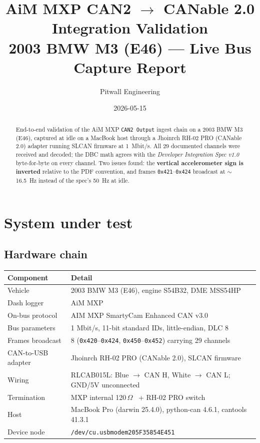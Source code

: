 \documentclass[11pt,a4paper]{article}
\title{\textbf{AiM MXP CAN2 $\rightarrow$ CANable 2.0 Integration Validation}\\
       \large 2003 BMW M3 (E46) --- Live Bus Capture Report}
\author{Pitwall Engineering}
\date{2026-05-15}
\newcommand{\ok}{\textcolor{ok}{\checkmark}}
\newcommand{\hex}[1]{\texttt{0x#1}}
\begin{document}
\maketitle

\begin{abstract}
\noindent
End-to-end validation of the AiM MXP \texttt{CAN2 Output} ingest chain
on a 2003 BMW M3 (E46), captured at idle on a MacBook host through a
Jhoinrch RH-02 PRO (CANable 2.0) adapter running SLCAN firmware at
\SI{1}{Mbit/s}. All 29 documented channels were received and
decoded; the DBC math agrees with the \emph{Developer Integration
Spec v1.0} byte-for-byte on every channel. Two issues found: the
\textbf{vertical accelerometer sign is inverted} relative to the PDF
convention, and frames \hex{421}--\hex{424} broadcast at $\sim$\SI{16.5}{Hz}
instead of the spec's \SI{50}{Hz} at idle.
\end{abstract}

\section{System under test}

\subsection{Hardware chain}

\begin{tabular}{@{}ll@{}}
\toprule
Component & Detail \\
\midrule
Vehicle              & 2003 BMW M3 (E46), engine S54B32, DME MSS54HP \\
Dash logger          & AiM MXP \\
On-bus protocol      & AIM MXP SmartyCam Enhanced CAN v3.0 \\
Bus parameters       & 1 Mbit/s, 11-bit standard IDs, little-endian, DLC 8 \\
Frames broadcast     & 8 (\hex{420}--\hex{424}, \hex{450}--\hex{452}) carrying 29 channels \\
CAN-to-USB adapter   & Jhoinrch RH-02 PRO (CANable 2.0), SLCAN firmware \\
Wiring               & RLCAB015L: Blue $\to$ CAN H, White $\to$ CAN L; GND/5V unconnected \\
Termination          & MXP internal 120\,$\Omega$ \ok\ + RH-02 PRO switch \ok\ \\
Host                 & MacBook Pro (darwin 25.4.0), python-can 4.6.1, cantools 41.3.1 \\
Device node          & \texttt{/dev/cu.usbmodem205F35854E451} \\
\bottomrule
\end{tabular}
\end{document}
